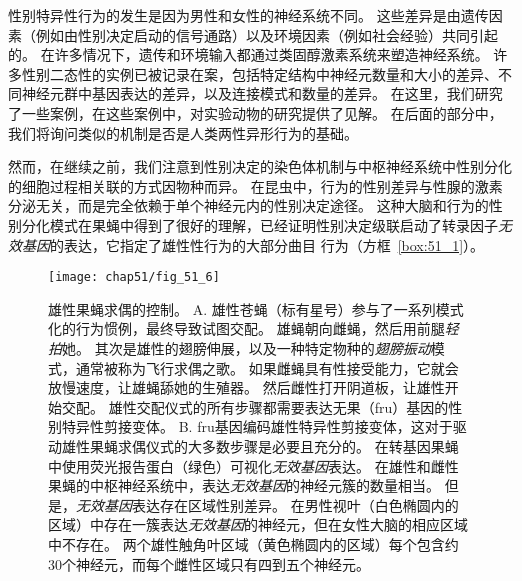 性别特异性行为的发生是因为男性和女性的神经系统不同。
这些差异是由遗传因素（例如由性别决定启动的信号通路）以及环境因素（例如社会经验）共同引起的。
在许多情况下，遗传和环境输入都通过类固醇激素系统来塑造神经系统。
许多性别二态性的实例已被记录在案，包括特定结构中神经元数量和大小的差异、不同神经元群中基因表达的差异，以及连接模式和数量的差异。
在这里，我们研究了一些案例，在这些案例中，对实验动物的研究提供了见解。
在后面的部分中，我们将询问类似的机制是否是人类两性异形行为的基础。


然而，在继续之前，我们注意到性别决定的染色体机制与中枢神经系统中性别分化的细胞过程相关联的方式因物种而异。
在昆虫中，行为的性别差异与性腺的激素分泌无关，而是完全依赖于单个神经元内的性别决定途径。
这种大脑和行为的性别分化模式在果蝇中得到了很好的理解，已经证明性别决定级联启动了转录因子\textit{无效基因}的表达，它指定了雄性性行为的大部分曲目 行为（方框~\ref{box:51_1}）。


\begin{figure}[htbp]
	\centering
	\texttt{[image: chap51/fig\_51\_6]}
	\caption{雄性果蝇求偶的控制。
		A. 雄性苍蝇（标有星号）参与了一系列模式化的行为惯例，最终导致试图交配。
		雄蝇朝向雌蝇，然后用前腿\textit{轻拍}她。
		其次是雄性的翅膀伸展，以及一种特定物种的\textit{翅膀振动}模式，通常被称为飞行求偶之歌。
		如果雌蝇具有性接受能力，它就会放慢速度，让雄蝇舔她的生殖器。
		然后雌性打开阴道板，让雄性开始交配。
		雄性交配仪式的所有步骤都需要表达无果（fru）基因的性别特异性剪接变体\cite{greenspan2000courtship}。
		B. fru基因编码雄性特异性剪接变体，这对于驱动雄性果蝇求偶仪式的大多数步骤是必要且充分的。
		在转基因果蝇中使用荧光报告蛋白（绿色）可视化\textit{无效基因}表达。
		在雄性和雌性果蝇的中枢神经系统中，表达\textit{无效基因}的神经元簇的数量相当。
		但是，\textit{无效基因}表达存在区域性别差异。
		在男性视叶（白色椭圆内的区域）中存在一簇表达\textit{无效基因}的神经元，但在女性大脑的相应区域中不存在。
		两个雄性触角叶区域（黄色椭圆内的区域）每个包含约30个神经元，而每个雌性区域只有四到五个神经元\cite{kimura2005fruitless}。}
	\label{fig:51_6}
\end{figure}


